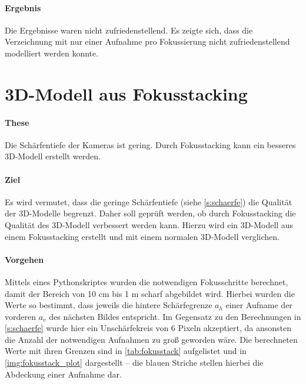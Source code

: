 \documentclass[./00PhotoBox.tex]{subfiles}
\begin{document}
\paragraph{Ergebnis}
Die Ergebnisse waren nicht zufriedenstellend. Es zeigte sich, dass die Verzeichnung mit nur einer Aufnahme pro Fokussierung nicht zufriedenstellend modelliert werden konnte.


\section{3D-Modell aus Fokusstacking}
\label{sec:fokusstacking}


\paragraph{These}
Die Schärfentiefe der Kameras ist gering. Durch Fokusstacking kann ein besseres 3D-Modell erstellt werden.

\paragraph{Ziel}
Es wird vermutet, dass die geringe Schärfentiefe (siehe \autoref{s:schaerfe}) die Qualität der 3D-Modelle begrenzt. Daher soll geprüft werden, ob durch Fokusstacking die Qualität des 3D-Modell verbessert werden kann. Hierzu wird ein 3D-Modell aus einem Fokusstacking erstellt und mit einem normalen 3D-Modell verglichen.

\paragraph{Vorgehen}

Mittels eines Pythonskriptes wurden die notwendigen Fokusschritte berechnet, damit der Bereich von 10 cm bis 1 m scharf abgebildet wird. Hierbei wurden die Werte so bestimmt, dass jeweils die hintere Schärfegrenze $a_h$ einer Aufname der vorderen $a_v$ des nächsten Bildes entspricht. Im Gegensatz zu den Berechnungen in \autoref{s:schaerfe} wurde hier ein Unschärfekreis von 6 Pixeln akzeptiert, da ansonsten die Anzahl der notwendigen Aufnahmen zu groß geworden wäre. Die berechneten Werte mit ihren Grenzen sind in \autoref{tab:fokusstack} aufgelistet und in \autoref{img:fokusstack_plot} dargestellt -- die blauen Striche stellen hierbei die Abdeckung einer Aufnahme dar.
\end{document}

